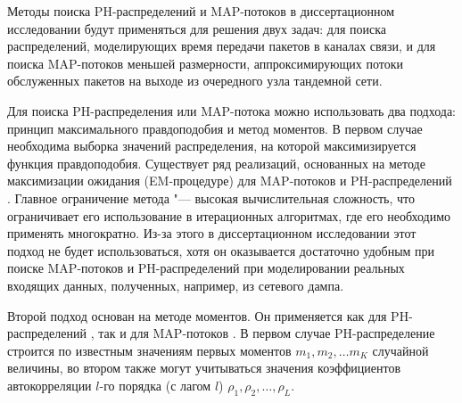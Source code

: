 Методы поиска PH-распределений и MAP-потоков в диссертационном исследовании будут применяться для решения двух задач: для поиска распределений, моделирующих время передачи пакетов в каналах связи, и для поиска MAP-потоков меньшей размерности, аппроксимирующих потоки обслуженных пакетов на выходе из очередного узла тандемной сети.

Для поиска PH-распределения или MAP-потока можно использовать два подхода: принцип максимального правдоподобия и метод моментов. В первом случае необходима выборка значений распределения, на которой максимизируется функция правдоподобия. Существует ряд реализаций, основанных на методе максимизации ожидания (EM-процедуре) для MAP-потоков \cite{Horvath2013,Ephraim2009,Buchholz2003,Okamura2009} и PH-распределений \cite{Asmussen1996,Bobbio1992,Thummler2005,Okamura2013,Okamura2011,ElAbdouniKhayari2003}. Главное ограничение метода "--- высокая вычислительная сложность, что ограничивает его использование в итерационных алгоритмах, где его необходимо применять многократно. Из-за этого в диссертационном исследовании этот подход не будет использоваться, хотя он оказывается достаточно удобным при поиске MAP-потоков и PH-распределений при моделировании реальных входящих данных, полученных, например, из сетевого дампа.

Второй подход основан на методе моментов. Он применяется как для PH-распределений \cite{Osogami2006,Bobbio2005,Johnson1989,Telek2003,Horvath2013,VandenBosch2000,Horvath2007,Schmickler1992}, так и для MAP-потоков \cite{TelekHorvath2007,Bodrog2010,Bodrog2008,Horvath2005,Schmickler1992,Casale2010}. В первом случае PH-распределение строится по известным значениям первых моментов $m_1, m_2, \dots m_K$ случайной величины, во втором также могут учитываться значения коэффициентов автокорреляции $l$-го порядка (с лагом $l$) $\rho_1, \rho_2, \dots, \rho_L$.

